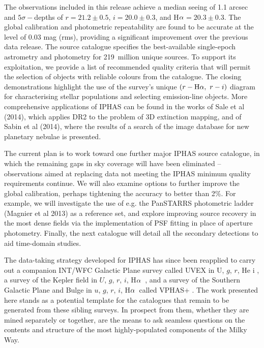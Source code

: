 \documentclass[useAMS,usenatbib]{mn2e}
\def\ha{\mbox{H$\rm \alpha$}}
\begin{document}
The observations included in this release
achieve a median seeing of 1.1 arcsec
and $5\sigma-$depths of $r=21.2\pm 0.5$, $i=20.0\pm 0.3$, and \ha$=20.3\pm 0.3$.
The global calibration and photometric repeatability
are found to be accurate at the level of $0.03$ mag (rms),
providing a significant improvement over the 
previous data release.
The source catalogue specifies the best-available
single-epoch astrometry and photometry
for 219~million unique sources.
To support its exploitation, we provide a list of recommended quality criteria
that will permit the selection of objects with reliable colours from 
the catalogue.  The closing demonstrations highlight the use of the 
survey's unique $(r-\ha,\ r-i)$ diagram for characterising stellar populations
and selecting emission-line objects.  More comprehensive applications of IPHAS
can be found in the works of Sale et al (2014), which applies DR2 to the problem
of 3D extinction mapping, and of Sabin et al (2014), where the results of a search
of the image database for new planetary nebulae is presented. 

The current plan is to work toward one further major IPHAS source catalogue, in which 
the remaining gaps in sky coverage will have been eliminated -- observations aimed at 
replacing data not meeting the IPHAS minimum quality requirements continue.  We will also 
examine options to further improve the global calibration, perhaps tightening the accuracy to
better than 2\%.  For example, we will investigate the use of e.g. the PanSTARRS photometric 
ladder (Magnier et al 2013) as a reference set, and explore improving source recovery in 
the most dense fields via the implementation of PSF fitting in place of aperture photometry.  
Finally, the next catalogue will detail all the secondary detections to aid time-domain studies.

The data-taking strategy developed for IPHAS
has since been reapplied to carry out 
a companion INT/WFC Galactic Plane survey called UVEX
in U, $g$, $r$, He {\sc i} \citep{Groot2009},
a survey of the Kepler field 
in $U$, $g$, $r$, $i$, \ha\ 
\citep{Greiss2012},
and a survey of the Southern Galactic Plane and Bulge
in $u$, $g$, $r$, $i$, \ha\ 
called VPHAS+ \citep{Drew2014}.  The work presented here
stands as a potential template for the catalogues that
remain to be generated from these sibling surveys.  
In prospect from them, whether they are mined separately or together,
are the means to ask seamless questions on the contents and structure of 
the most highly-populated components of the Milky Way.  
\end{document}
